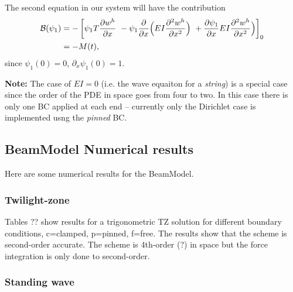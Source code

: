 \documentclass[11pt]{article}
\begin{document}
The second equation in our system will have the contribution 
\begin{align}
   \mathcal{B}(\psi_1) &= -\left[\psi_1 T \frac{\partial w^h}{\partial x} ~ - \psi_1 \frac{\partial}{\partial x}\Big( E I \frac{\partial^2 w^h}{\partial x^2}\Big) 
                      ~ + \frac{\partial \psi_1}{\partial x}E I \frac{\partial^2 w^h}{\partial x^2}\Big)  
                      \right]_0 \\
        &= - M(t) , 
\end{align}
since $\psi_1(0)=0$, $\partial_x\psi_1(0)=1$.

{\bf Note:} The case of $E I= 0$ (i.e. the wave equaiton for a {\em string}) 
is a special case since the order of the PDE in space goes from four to two. In this
case there is only one BC applied at each end -- currently only the Dirichlet case
is implemented usng the {\em pinned} BC. 



\clearpage
\subsection{BeamModel Numerical results} \label{eq:BeamModel_Results}


Here are some numerical results for the BeamModel.


\subsubsection{Twilight-zone} 

Tables ?? show results for a trigonometric TZ solution for different boundary conditions, c=clamped, p=pinned, f=free.
The results show that the scheme is second-order accurate. 
The scheme is 4th-order (?) in space but the force integration is only done to second-order.

{
 
 
 
}

\clearpage
\subsubsection{Standing wave} 
\end{document}
